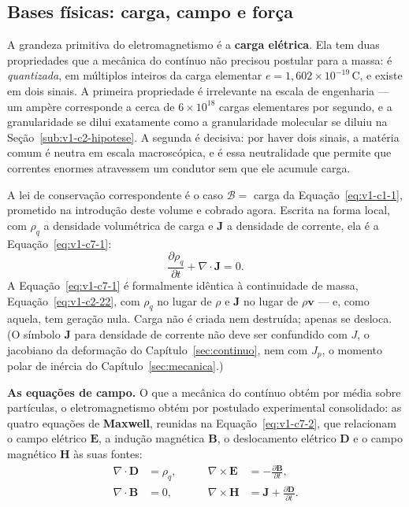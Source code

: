 \documentclass[12pt,a4paper]{article}
\numberwithin{equation}{section}
\numberwithin{table}{section}
\numberwithin{figure}{section}
\begin{document}
\subsection{Bases físicas: carga, campo e força}\label{sub:v1-c7-bases}

A grandeza primitiva do eletromagnetismo é a \textbf{carga elétrica}. Ela tem
duas propriedades que a mecânica do contínuo não precisou postular para a
massa: é \emph{quantizada}, em múltiplos inteiros da carga elementar
$e = 1{,}602\times10^{-19}\,$C, e existe em dois sinais. A primeira propriedade
é irrelevante na escala de engenharia --- um ampère corresponde a cerca de
$6\times10^{18}$ cargas elementares por segundo, e a granularidade se dilui
exatamente como a granularidade molecular se diluiu na
Seção~\ref{sub:v1-c2-hipotese}. A segunda é decisiva: por haver dois sinais, a
matéria comum é neutra em escala macroscópica, e é essa neutralidade que
permite que correntes enormes atravessem um condutor sem que ele acumule carga.

A lei de conservação correspondente é o caso $\mathcal{B} =$ carga da
Equação~\eqref{eq:v1-c1-1}, prometido na introdução deste volume e cobrado
agora. Escrita na forma local, com $\rho_q$ a densidade volumétrica de carga e
$\mathbf{J}$ a densidade de corrente, ela é a Equação~\eqref{eq:v1-c7-1}:
\begin{equation}\label{eq:v1-c7-1}
\frac{\partial \rho_q}{\partial t} + \nabla\cdot\mathbf{J} = 0 .
\end{equation}
A Equação~\eqref{eq:v1-c7-1} é formalmente idêntica à continuidade de massa,
Equação~\eqref{eq:v1-c2-22}, com $\rho_q$ no lugar de $\rho$ e $\mathbf{J}$ no
lugar de $\rho\mathbf{v}$ --- e, como aquela, tem geração nula. Carga não é
criada nem destruída; apenas se desloca. (O símbolo $\mathbf{J}$ para densidade
de corrente não deve ser confundido com $J$, o jacobiano da deformação do
Capítulo~\ref{sec:continuo}, nem com $J_p$, o momento polar de inércia do
Capítulo~\ref{sec:mecanica}.)

\textbf{As equações de campo.} O que a mecânica do contínuo obtém por média
sobre partículas, o eletromagnetismo obtém por postulado experimental
consolidado: as quatro equações de \textbf{Maxwell}, reunidas na
Equação~\eqref{eq:v1-c7-2}, que relacionam o campo elétrico $\mathbf{E}$, a
indução magnética $\mathbf{B}$, o deslocamento elétrico $\mathbf{D}$ e o campo
magnético $\mathbf{H}$ às suas fontes:
\begin{equation}\label{eq:v1-c7-2}
\begin{aligned}
\nabla\cdot\mathbf{D} &= \rho_q, &\qquad
\nabla\times\mathbf{E} &= -\frac{\partial\mathbf{B}}{\partial t}, \\[4pt]
\nabla\cdot\mathbf{B} &= 0, &\qquad
\nabla\times\mathbf{H} &= \mathbf{J} + \frac{\partial\mathbf{D}}{\partial t} .
\end{aligned}
\end{equation}
\end{document}

